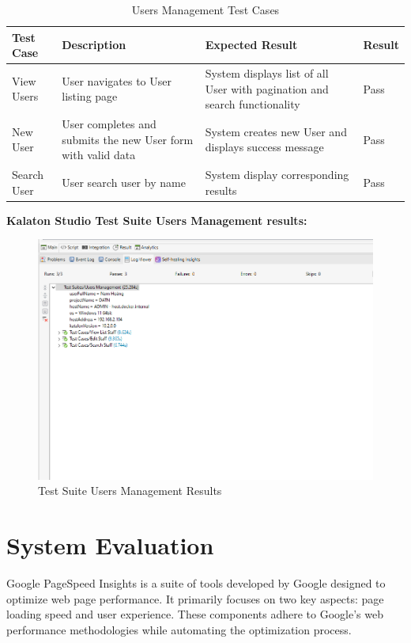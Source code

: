 \begin{itemize}
\begin{table}[H]
  \caption{Users Management Test Cases}
  \begin{tabular}{|p{4cm}|p{5cm}|p{4cm}|p{1cm}|}
  \hline
  \textbf{Test Case} & \textbf{Description} & \textbf{Expected Result} & \textbf{Result} \\
  \hline
  View Users & User navigates to User listing page & System displays list of all User with pagination and search functionality & Pass \\
  \hline
  New User & User completes and submits the new User form with valid data & System creates new User and displays success message & Pass \\
  \hline
  Search User & User search user by name & System display corresponding results & Pass \\
  \hline
  \end{tabular}
  \label{tab:users_test}
  \end{table}
  \textbf{Kalaton Studio Test Suite Users Management results:} 
  \begin{figure}[H]
    \centering
    \includegraphics[width=15cm]{graphics/chapter6/test_suite_users.png}
    \caption{Test Suite Users Management Results}
    \label{fig:test_suite_users_management}
  \end{figure}
\end{itemize}

\section{System Evaluation}
Google PageSpeed Insights \cite{google_page_speed} is a suite of tools developed by Google designed to optimize web page performance. It primarily focuses on two key aspects: page loading speed and user experience. These components adhere to Google's web performance methodologies while automating the optimization process.


